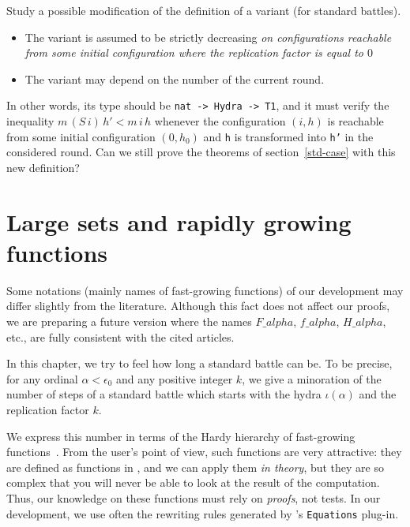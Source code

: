 \begin{project}
Study a possible modification of the definition of a variant  (for  standard battles).

\begin{itemize}
\item The variant is assumed to be strictly decreasing \emph{on configurations 
reachable from some initial configuration where the replication factor is equal to $0$}
\item The variant may depend on the number of the current round.
\end{itemize}

In other words, its type should be \texttt{nat -> Hydra -> T1}, and it must 
verify the inequality $m\, (S\,i)\, h' < m\,i\, h$ whenever the configuration 
$(i,h)$ is reachable from some initial configuration $(0,h_0)$
and \texttt{h} is transformed into \texttt{h'} in the considered round.
Can we still prove the theorems of section~\ref{std-case} with this new definition?

\end{project}


 
\chapter{Large sets and rapidly growing functions}\label{chap:alpha-large}

\begin{remark}
Some notations (mainly names of fast-growing functions) of our development may differ slightly from the literature. Although this fact does not affect our proofs, we are preparing a future version where the names $F\_alpha$, $f\_alpha$, $H\_alpha$, etc., are fully consistent with the cited articles.

\end{remark}

In this chapter, we try to feel how long a standard battle can be.
To be precise, for any ordinal $\alpha<\epsilon_0$ and any positive integer $k$,
we give a minoration of the number of steps of a standard battle which
starts with the hydra $\iota(\alpha)$ and the replication factor $k$.

We express this number in terms of the Hardy hierarchy of fast-growing 
functions~\cite{BW85, Wainer1970, KS81, Promel2013}.
 From the \coq{} user's point of view, such  functions are  very 
attractive:  they are defined as functions  in \gallina{}, and we can apply them \emph{in theory}, but they are so complex that you will never be able to look at the result of the computation.
 Thus, our knowledge on these functions must rely on \emph{proofs}, not tests. In our development, we use often the rewriting rules generated by \coq's \texttt{Equations} plug-in.


